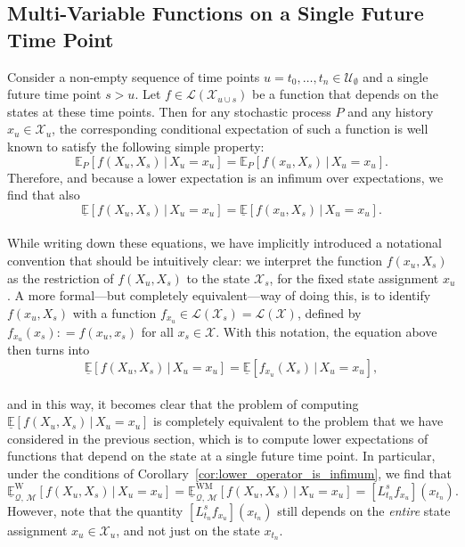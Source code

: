 \documentclass[10pt,a4paper]{paper}
\theoremstyle{definition}
\newcommand{\states}{\mathcal{X}}
\newcommand{\gambles}{\mathcal{L}}
\newcommand{\gamblesX}{\gambles(\states)}
\newcommand{\rateset}{\mathcal{Q}}
\newcommand{\coloneqq}{:\!=}
\begin{document}
\subsection{Multi-Variable Functions on a Single Future Time Point}\label{sec:function_single_future_multiple_past}

Consider a non-empty sequence of time points $u=t_0,\ldots,t_n\in\mathcal{U}_\emptyset$ and a single future time point $s>u$. Let $f\in\gambles(\states_{u\cup s})$ be a function that depends on the states at these time points. Then for any stochastic process $P$ and any history $x_u\in\states_u$, the corresponding conditional expectation of such a function is well known to satisfy the following simple property:
\vspace{-2pt}
\begin{equation*}
\mathbb{E}_P[f(X_u,X_s)\,\vert\,X_u=x_u] = \mathbb{E}_P[f(x_u,X_s)\,\vert\,X_u=x_u].
\end{equation*}
Therefore, and because a lower expectation is an infimum over expectations, we find that also
\vspace{-2pt}
\begin{equation}\label{eq:fixxu}
\underline{\mathbb{E}}[f(X_u,X_s)\,\vert\,X_u=x_u] = \underline{\mathbb{E}}[f(x_u,X_s)\,\vert\,X_u=x_u].
\end{equation}\\[-18pt]

While writing down these equations, we have implicitly introduced a notational convention that should be intuitively clear: we interpret the function $f(x_u,X_s)$ as the restriction of $f(X_u,X_s)$ to the state $\states_s$, for the fixed state assignment $x_u$. A more formal---but completely equivalent---way of doing this, is to identify $f(x_u,X_s)$ with a function $f_{x_u}\in\gambles(\states_s)=\gamblesX$, defined by $f_{x_u}(x_s)\coloneqq f(x_u,x_s)$ for all $x_s\in\states$.
With this notation, the equation above then turns into
\begin{equation*}%
\underline{\mathbb{E}}[f(X_u,X_s)\,\vert\,X_u=x_u] = \underline{\mathbb{E}}[f_{x_u}(X_s)\,\vert\,X_u=x_u],
\end{equation*}\\[-14pt]
and in this way, it becomes clear that the problem of computing $\underline{\mathbb{E}}[f(X_u,X_s)\,\vert\,X_u=x_u]$ is completely equivalent to the problem that we have considered in the previous section, which is to compute lower expectations of functions that depend on the state at a single future time point.
In particular, under the conditions of Corollary~\ref{cor:lower_operator_is_infimum}, we find that
\begin{equation*}
\underline{\mathbb{E}}_{\rateset,\,\mathcal{M}}^{\mathrm{W}}[f(X_u,X_s)\,\vert\,X_u=x_u] = \underline{\mathbb{E}}_{\rateset,\,\mathcal{M}}^{\mathrm{WM}}[f(X_u,X_s)\,\vert\,X_u=x_u]=\left[L_{t_n}^sf_{x_u}\right](x_{t_n}).
\end{equation*}
However, note that the quantity $[L_{t_n}^sf_{x_u}](x_{t_n})$ still depends on the \emph{entire} state assignment $x_u\in\states_u$, and not just on the state $x_{t_n}$.
\end{document}
